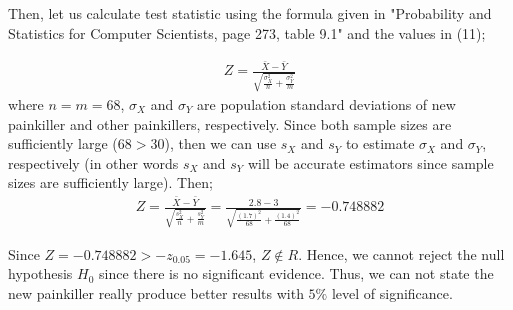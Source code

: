\documentclass[12pt]{article}
\begin{document}
Then, let us calculate test statistic using the formula given in "Probability and Statistics for Computer Scientists, page 273, table 9.1" and the values in (11);

\begin{equation} 
\begin{split}
Z = \frac{\bar{X}-\bar{Y}}{\sqrt{\frac{\sigma^{2}_{X}}{n} + \frac{\sigma^{2}_{Y}}{m}}}
\end{split}
\end{equation}
where $n = m = 68$, $\sigma_{X}$ and $\sigma_{Y}$ are population standard deviations of new painkiller and other painkillers, respectively. Since both sample sizes are sufficiently large ($68 > 30$), then we can use $s_{X}$ and $s_{Y}$ to estimate $\sigma_{X}$ and $\sigma_{Y}$, respectively (in other words $s_{X}$ and $s_{Y}$ will be accurate estimators since sample sizes are sufficiently large). Then;
\begin{equation} 
\begin{split}
Z = \frac{\bar{X}-\bar{Y}}{\sqrt{\frac{s^{2}_{X}}{n} + \frac{s^{2}_{Y}}{m}}} = \frac{2.8-3}{\sqrt{\frac{(1.7)^{2}}{68} + \frac{(1.4)^{2}}{68}}} = -0.748882
\end{split}
\end{equation}

Since $Z = -0.748882  >  -z_{0.05} = -1.645$, $ Z \notin R$. Hence, we cannot reject the null hypothesis $H_{0}$ since there is no significant evidence. Thus, we can not state the new painkiller really produce better results with $5 \%$
level of significance.
\end{document}

